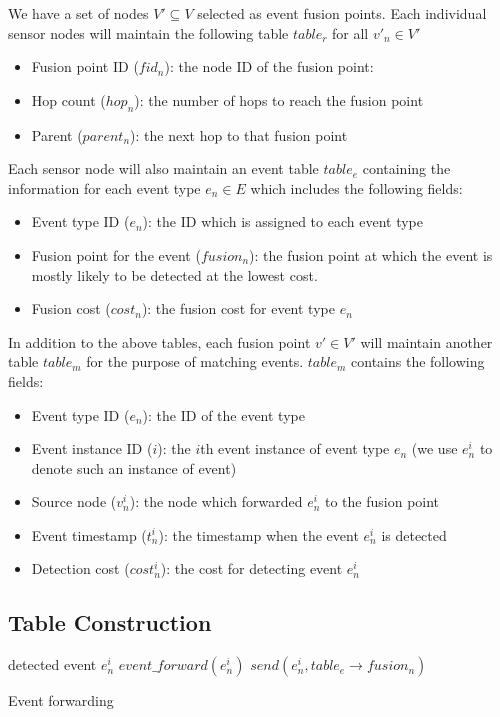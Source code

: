 We have a set of nodes \(V'\subseteq V\) selected as event fusion points. Each individual sensor nodes will maintain the following table \(table_r\) for all \(v'_n\in V'\)
\begin{itemize}
\item Fusion point ID (\(fid_n\)): the node ID of the fusion point:
\item	Hop count (\(hop_n\)): the number of hops to reach the fusion point
\item	Parent (\(parent_n\)): the next hop to that fusion point\\
\end{itemize}
Each sensor node will also maintain an event table \(table_e\) containing the information for each event type \(e_n\in E\) which includes the following fields:
\begin{itemize}
\item Event type ID (\(e_n\)): the ID which is assigned to each event type
\item Fusion point for the event (\(fusion_n\)): the fusion point at which the event is mostly likely to be detected at the lowest cost.
\item Fusion cost (\(cost_n\)): the fusion cost for event type \(e_n\)\\
\end{itemize}
In addition to the above tables, each fusion point \(v'\in V'\) will maintain another table \(table_m\) for the purpose of matching events. \(table_m\) contains the following fields:
\begin{itemize}
\item Event type ID (\(e_n\)): the ID of the event type
\item Event instance ID (\(i\)): the \(i\)th event instance of event type \(e_n\) (we use \(e_n^i\) to denote such an instance of event)
\item Source node (\(v_n^i\)): the node which forwarded \(e_n^i\) to the fusion point
\item Event timestamp (\(t_n^i\)): the timestamp when the event \(e_n^i\) is detected
\item Detection cost (\(cost_n^i\)): the cost for detecting event \(e_n^i\)
\end{itemize}

\subsection{Table Construction}

\begin{algorithm}
\begin{algorithmic}[1]
\REQUIRE detected event \(e_n^i\)
		\STATE \(event\_forward(e_n^i)\)
	\ELSE
		\STATE \(send(e_n^i, table_e\rightarrow fusion_n)\)
	\ENDIF
\end{algorithmic}
\caption{Event forwarding}
\label{algo:eventforwarding}
\end{algorithm}

